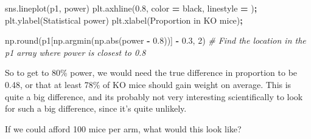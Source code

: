 \documentclass[
  letterpaper,
]{scrbook}
\newenvironment{Shaded}{\begin{snugshade}}{\end{snugshade}}
\newcommand{\BuiltInTok}[1]{#1}
\newcommand{\CommentTok}[1]{\textcolor[rgb]{0.56,0.35,0.01}{\textit{#1}}}
\newcommand{\DecValTok}[1]{\textcolor[rgb]{0.00,0.00,0.81}{#1}}
\newcommand{\FloatTok}[1]{\textcolor[rgb]{0.00,0.00,0.81}{#1}}
\newcommand{\NormalTok}[1]{#1}
\newcommand{\OperatorTok}[1]{\textcolor[rgb]{0.81,0.36,0.00}{\textbf{#1}}}
\newcommand{\StringTok}[1]{\textcolor[rgb]{0.31,0.60,0.02}{#1}}
\begin{document}
\begin{Shaded}
\begin{Highlighting}[]
\NormalTok{sns.lineplot(p1, power)}
\NormalTok{plt.axhline(}\FloatTok{0.8}\NormalTok{, color }\OperatorTok{=} \StringTok{\textquotesingle{}black\textquotesingle{}}\NormalTok{, linestyle }\OperatorTok{=} \StringTok{\textquotesingle{}{-}{-}\textquotesingle{}}\NormalTok{)}\OperatorTok{;}
\NormalTok{plt.ylabel(}\StringTok{\textquotesingle{}Statistical power\textquotesingle{}}\NormalTok{)}
\NormalTok{plt.xlabel(}\StringTok{\textquotesingle{}Proportion in KO mice\textquotesingle{}}\NormalTok{)}\OperatorTok{;}
\end{Highlighting}
\end{Shaded}

\begin{Shaded}
\begin{Highlighting}[]
\NormalTok{np.}\BuiltInTok{round}\NormalTok{(p1[np.argmin(np.}\BuiltInTok{abs}\NormalTok{(power }\OperatorTok{{-}} \FloatTok{0.8}\NormalTok{))] }\OperatorTok{{-}} \FloatTok{0.3}\NormalTok{, }\DecValTok{2}\NormalTok{) }\CommentTok{\# Find the location in the p1 array where power is closest to 0.8}
\end{Highlighting}
\end{Shaded}

So to get to 80\% power, we would need the true difference in proportion to be 0.48, or that at least 78\% of KO mice should gain weight on average. This is quite a big difference, and its probably not very interesting scientifically to look for such a big difference, since it's quite unlikely.

If we could afford 100 mice per arm, what would this look like?
\end{document}
